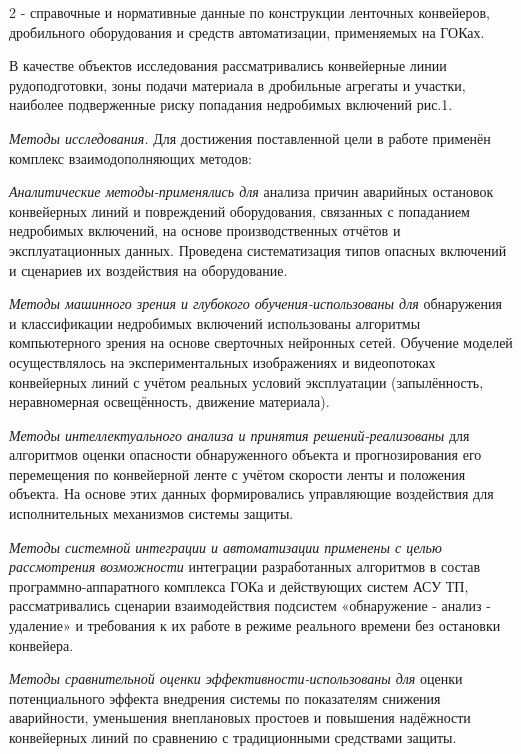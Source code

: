 \begin{multicols}{2}
- справочные и нормативные данные по конструкции ленточных конвейеров,
дробильного оборудования и средств автоматизации, применяемых на ГОКах.

В качестве объектов исследования рассматривались конвейерные линии
рудоподготовки, зоны подачи материала в дробильные агрегаты и участки,
наиболее подверженные риску попадания недробимых включений рис.1.

\emph{Методы исследования.} Для достижения поставленной цели в работе
применён комплекс взаимодополняющих методов:

\emph{Аналитические методы-применялись для} анализа причин аварийных
остановок конвейерных линий и повреждений оборудования, связанных с
попаданием недробимых включений, на основе производственных отчётов и
эксплуатационных данных. Проведена систематизация типов опасных
включений и сценариев их воздействия на оборудование.

\emph{Методы машинного зрения и глубокого обучения-использованы для}
обнаружения и классификации недробимых включений использованы алгоритмы
компьютерного зрения на основе сверточных нейронных сетей. Обучение
моделей осуществлялось на экспериментальных изображениях и видеопотоках
конвейерных линий с учётом реальных условий эксплуатации (запылённость,
неравномерная освещённость, движение материала).

\emph{Методы интеллектуального анализа и принятия решений-реализованы}
для алгоритмов оценки опасности обнаруженного объекта и прогнозирования
его перемещения по конвейерной ленте с учётом скорости ленты и положения
объекта. На основе этих данных формировались управляющие воздействия для
исполнительных механизмов системы защиты.

\emph{Методы системной интеграции и автоматизации применены с целью
рассмотрения возможности} интеграции разработанных алгоритмов в состав
программно-аппаратного комплекса ГОКа и действующих систем АСУ ТП,
рассматривались сценарии взаимодействия подсистем «обнаружение - анализ
- удаление» и требования к их работе в режиме реального времени без
остановки конвейера.

\emph{Методы сравнительной оценки эффективно\-сти-использованы для} оценки
потенциального эффекта внедрения системы по показателям снижения
аварийности, уменьшения внеплановых простоев и повышения надёжности
конвейерных линий по сравнению с традиционными средствами защиты.
\end{multicols}

\begin{figs}
\end{figs}
\vspace{-0.7cm}
\begin{figs}
\end{figs}


